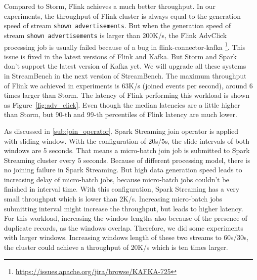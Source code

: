 Compared to Storm, Flink achieves a much better throughput. In our experiments, the throughput of Flink cluster is always equal to the generation speed of stream \texttt{shown advertisements}. But when the generation speed of stream \texttt{shown advertisements} is larger than 200K/s, the Flink AdvClick processing job is usually failed because of a bug in flink-connector-kafka \footnote{\url{https://issues.apache.org/jira/browse/KAFKA-725}}. This issue is fixed in the latest versions of Flink and Kafka. But Storm and Spark don't support the latest version of Kafka yet. We will upgrade all these systems in StreamBench in the next version of StreamBench. The maximum throughput of Flink we achieved in experiments is 63K/s (joined events per second), around 6 times larger than Storm. The latency of Flink performing this workload is shown as Figure~\ref{fig:adv_click}. Even though the median latencies are a little higher than Storm, but 90-th and 99-th percentiles of Flink latency are much lower. 

As discussed in \cref{sub:join_operator}, Spark Streaming join operator is applied with sliding window. With the configuration of 20s/5s, the slide intervals of both windows are 5 seconds. That means a micro-batch join job is submitted to Spark Streaming cluster every 5 seconds. Because of different processing model, there is no joining failure in Spark Streaming. But high data generation speed leads to increasing delay of micro-batch jobs, because micro-batch jobs couldn't be finished in interval time. With this configuration, Spark Streaming has a very small throughput which is lower than 2K/s. Increasing micro-batch jobs submitting interval might increase the throughput, but leads to higher latency. For this workload, increasing the window lengths also because of the presence of duplicate records, as the windows overlap. Therefore, we did some experiments with larger windows. Increasing windows length of these two streams to 60s/30s, the cluster could achieve a throughput of 20K/s which is ten times larger. 

